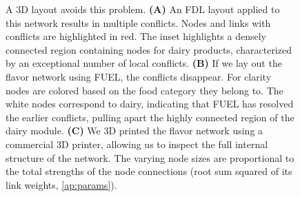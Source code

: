 \documentclass[nofootinbib,preprint,floatfix,titlepage,superscriptaddress]{revtex4} %
\begin{document}
\begin{figure}
{    A 3D layout avoids this problem. 
    {\bf (A)} An FDL layout applied to this network results in multiple conflicts.
    Nodes and links with conflicts are highlighted in red. 
    The inset highlights a densely connected region containing nodes for dairy products, characterized by an exceptional number of local conflicts. 
    {\bf (B)} If we lay out the flavor network using FUEL, the conflicts disappear. 
    For clarity nodes are colored based on the food category they belong to. 
    The white nodes correspond to dairy, indicating that 
    FUEL has %
    resolved the earlier conflicts, pulling apart the highly connected region of the dairy module.  
    {\bf (C)} We 3D printed the flavor network using a commercial 3D printer, allowing us to inspect the full internal structure of the network. %
    The varying node sizes are proportional to the total strengths of the node connections (root sum squared of its link weights, \ref{ap:params}). 
    }
    \label{fig:3d-print}
    \newpage
\end{figure}
  
\end{document}
